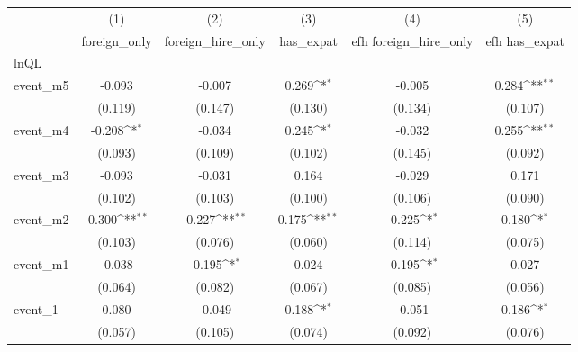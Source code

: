 {
\def\sym#1{\ifmmode^{#1}\else\(^{#1}\)\fi}
\begin{tabular}{l*{5}{c}}
\hline\hline
            &\multicolumn{1}{c}{(1)}&\multicolumn{1}{c}{(2)}&\multicolumn{1}{c}{(3)}&\multicolumn{1}{c}{(4)}&\multicolumn{1}{c}{(5)}\\
            &\multicolumn{1}{c}{foreign\_only}&\multicolumn{1}{c}{foreign\_hire\_only}&\multicolumn{1}{c}{has\_expat}&\multicolumn{1}{c}{efh foreign\_hire\_only}&\multicolumn{1}{c}{efh has\_expat}\\
\hline
lnQL        &                     &                     &                     &                     &                     \\
event\_m5    &      -0.093         &      -0.007         &       0.269\sym{*}  &      -0.005         &       0.284\sym{**} \\
            &     (0.119)         &     (0.147)         &     (0.130)         &     (0.134)         &     (0.107)         \\
[1em]
event\_m4    &      -0.208\sym{*}  &      -0.034         &       0.245\sym{*}  &      -0.032         &       0.255\sym{**} \\
            &     (0.093)         &     (0.109)         &     (0.102)         &     (0.145)         &     (0.092)         \\
[1em]
event\_m3    &      -0.093         &      -0.031         &       0.164         &      -0.029         &       0.171         \\
            &     (0.102)         &     (0.103)         &     (0.100)         &     (0.106)         &     (0.090)         \\
[1em]
event\_m2    &      -0.300\sym{**} &      -0.227\sym{**} &       0.175\sym{**} &      -0.225\sym{*}  &       0.180\sym{*}  \\
            &     (0.103)         &     (0.076)         &     (0.060)         &     (0.114)         &     (0.075)         \\
[1em]
event\_m1    &      -0.038         &      -0.195\sym{*}  &       0.024         &      -0.195\sym{*}  &       0.027         \\
            &     (0.064)         &     (0.082)         &     (0.067)         &     (0.085)         &     (0.056)         \\
[1em]
event\_1     &       0.080         &      -0.049         &       0.188\sym{*}  &      -0.051         &       0.186\sym{*}  \\
            &     (0.057)         &     (0.105)         &     (0.074)         &     (0.092)         &     (0.076)         \\

\end{tabular}}
